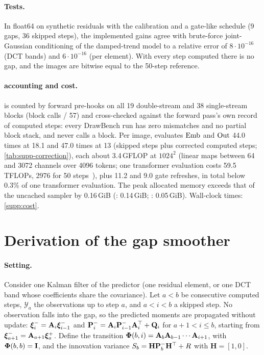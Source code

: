 \paragraph{Tests.}
In float64 on synthetic residuals with the \flux calibration and a gate-like schedule (9 gaps, 36 skipped steps), the
implemented gains agree with brute-force joint-Gaussian conditioning of the damped-trend model to a relative error of
$8\cdot10^{-16}$ (DCT bands) and $6\cdot10^{-16}$ (per element). With every step computed there is no gap, and the
images are bitwise equal to the 50-step reference.

\paragraph{\nfe accounting and cost.}
\nfe is counted by forward pre-hooks on all 19 double-stream and 38 single-stream blocks (block calls / 57) and
cross-checked against the forward pass's own record of computed steps: every DrawBench run has zero mismatches and no
partial block stack, and \pcgs never calls a block. Per image, \ours evaluates $\operatorname{Emb}$ and $\operatorname{Out}$ 44.0 times at 18.1
\nfe and 47.0 times at 13 \nfe (skipped steps plus corrected computed steps; \cref{tab:supp-correction}), each about
3.4\,GFLOP at $1024^2$ (linear maps between 64 and 3072 channels over 4096 tokens; one transformer evaluation costs
59.5\,TFLOPs, 2976 for 50 steps~\cite{chung2026seacache}), plus 11.2 and 9.0 gate refreshes, in total below 0.3\% of one transformer
evaluation. The peak allocated memory exceeds that of the uncached sampler by 0.16\,GiB (\kalsea: 0.14\,GiB; \seacache:
0.05\,GiB). Wall-clock times: \cref{supp:cost}.

\section{Derivation of the gap smoother}
\label{supp:smoother}

\paragraph{Setting.}
Consider one Kalman filter of the predictor (one residual element, or one DCT band whose coefficients share the
covariance). Let $a<b$ be consecutive computed steps, $\mathcal Y_a$ the observations up to step $a$, and $a<i<b$ a
skipped step. No observation falls into the gap, so the predicted moments are propagated without update:
$\bm{\xi}^{-}_{i}=\mathbf{A}_i\bm{\xi}^{-}_{i-1}$ and $\mathbf{P}^{-}_i=\mathbf{A}_i\mathbf{P}^{-}_{i-1}\mathbf{A}_i^\top+\mathbf{Q}_i$ for
$a+1<i\le b$, starting from $\bm{\xi}^{-}_{a+1}=\mathbf{A}_{a+1}\bm{\xi}^{+}_a$. Define the transition
$\bm{\Phi}(b,i)=\mathbf{A}_b\mathbf{A}_{b-1}\cdots\mathbf{A}_{i+1}$, with $\bm{\Phi}(b,b)=\mathbf I$, and the innovation variance
$S_b=\mathbf H\mathbf{P}^{-}_b\mathbf H^\top+R$ with $\mathbf H=[1,0]$.

